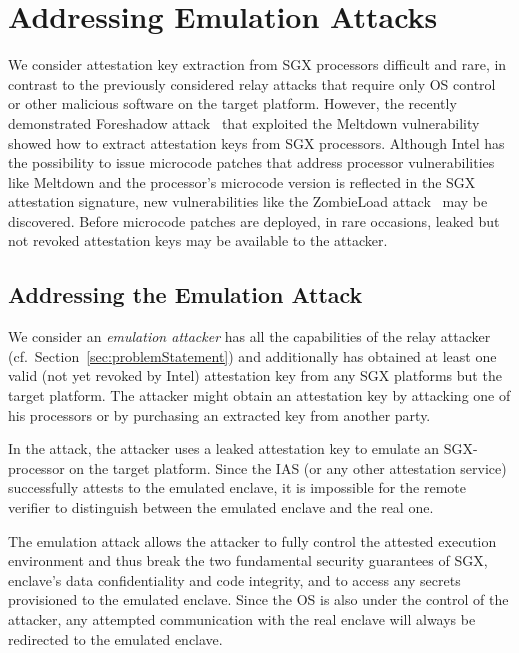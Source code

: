 \section{Addressing Emulation Attacks}
\label{sec:variantII}

We consider attestation key extraction from SGX processors difficult and rare, in contrast to the previously considered relay attacks that require only OS control or other malicious software on the target platform. However, the recently demonstrated Foreshadow attack~\cite{foreshadow-usenix18} that exploited the Meltdown vulnerability~\cite{Lipp2018meltdown} showed how to extract attestation keys from SGX processors. Although Intel has the possibility to issue microcode patches that address processor vulnerabilities like Meltdown and the processor's microcode version is reflected in the SGX attestation signature, new vulnerabilities like the ZombieLoad attack~\cite{ZombieLoad} may be discovered. Before microcode patches are deployed, in rare occasions, leaked but not revoked attestation keys may be available to the attacker.


\subsection{Addressing the Emulation Attack} 

We consider an \emph{emulation attacker} has all the capabilities of the relay attacker (cf.\ Section~\ref{sec:problemStatement}) and additionally has obtained at least one valid (not yet revoked by Intel) attestation key from any SGX platforms but the target platform. The attacker might obtain an attestation key by attacking one of his processors or by purchasing an extracted key from another party. 

In the attack, the attacker uses a leaked attestation key to emulate an SGX-processor on the target platform. Since the IAS (or any other attestation service) successfully attests to the emulated enclave, it is impossible for the remote verifier to distinguish between the emulated enclave and the real one. 


The emulation attack allows the attacker to fully control the attested execution environment and thus break the two fundamental security guarantees of SGX, enclave's data confidentiality and code integrity, and to access any secrets provisioned to the emulated enclave. Since the OS is also under the control of the attacker, any attempted communication with the real enclave will always be redirected to the emulated enclave.



